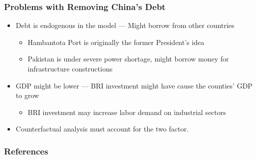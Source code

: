 \documentclass[mathserif]{beamer}
\begin{document}
    \begin{frame}
        \frametitle{Problems with Removing China's Debt}

        \begin{itemize}
            \item Debt is endogenous in the model --- Might borrow from other countries
            \begin{itemize}
                \item Hambantota Port is originally the former President's idea
                \item Pakistan is under severe power shortage, might borrow money for infrastructure constructions
            \end{itemize}
            \item GDP might be lower --- BRI investment might have cause the counties' GDP to grow
            \begin{itemize}
                \item BRI investment may increase labor demand on industrial sectors
            \end{itemize}
            \item Counterfactual analysis must account for the two factor.
        \end{itemize}
    
        
    
    \end{frame}
    \appendix
    \begin{frame}[allowframebreaks]
            \frametitle{References}
            
            
    \end{frame}
\end{document}
